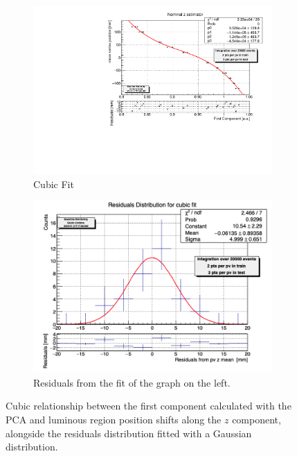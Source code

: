 \begin{figure}
    \centering
    \begin{subfigure}{0.48\textwidth}
    \includegraphics[width=\linewidth]{figures/z_cubic_fit.pdf}
    \caption{Cubic Fit}\label{fig:zfit_cubic_MC}
    \end{subfigure}
    \begin{subfigure}{0.48\textwidth}
    \includegraphics[width=\linewidth]{figures/z_cubic_res.png}
    \caption{Residuals from the fit of the graph on the left. }\label{fig:zres_cubic_MC}
    \end{subfigure}
    \caption{Cubic relationship between the first component calculated with the PCA and luminous region position shifts along the $z$ component, alongside the residuals distribution fitted with a Gaussian distribution.}
    \label{fig:z_cubic_MC}
\end{figure}

